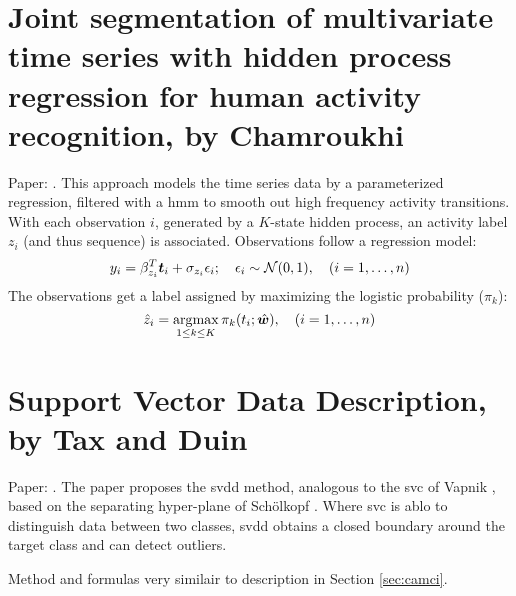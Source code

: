 \section{Joint segmentation of multivariate time series with hidden process regression for human activity recognition, by Chamroukhi}\label{sec:appendix-C-joint-segmentation}
Paper: \cite{chamroukhi2013joint}.
This approach models the time series data by a parameterized regression, filtered with a \gls{hmm} to smooth out high frequency activity transitions.
With each observation $i$, generated by a $K$-state hidden process, an activity label $z_i$ (and thus sequence) is associated.
Observations follow a regression model:
%
\begin{equation}
  y_i = \beta_{z_i}^T \vectorsym{t}_i + \sigma_{z_i} \epsilon_i; \quad \epsilon_i \sim \mathcal{N}(0,1), \quad (i=1, \dots ,n)
\end{equation}
%
The observations get a label assigned by maximizing the logistic probability ($\pi_k$):
%
\begin{equation}
  \hat{z}_i = \argmaxold \limits_{1 \leq k \leq K} \pi_k (t_i; \hat{\vectorsym{w}}), \quad (i=1, \dots, n)
\end{equation}
%






\clearpage
\section{Support Vector Data Description, by Tax and Duin}
Paper: \cite{tax2004support}.
The paper proposes the \gls{svdd} method, analogous to the \gls{svc} of Vapnik \cite{vapnik1998statistical}, based on the separating hyper-plane of Sch{\"o}lkopf \etal \cite{scholkopf1999sv}.
Where \gls{svc} is ablo to distinguish data between two classes, \gls{svdd} obtains a closed boundary around the target class and can detect outliers.

Method and formulas very similair to description in Section \ref{sec:camci}.






\clearpage
